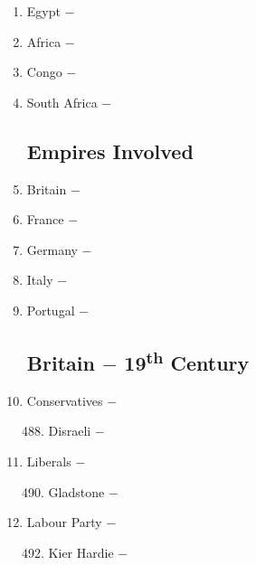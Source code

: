 \documentclass[12pt]{article}
\begin{document}
\begin{enumerate}
\item Egypt $-$

\item Africa $-$ 

\item Congo $-$ 

\item South Africa $-$ 

\subsection{Empires Involved}

\item Britain $-$ 

\item France $-$ 

\item Germany $-$ 

\item Italy $-$ 

\item Portugal $-$ 

\subsection{Britain $-$ 19\textsuperscript{th} Century}

\item Conservatives $-$ 

\begin{enumerate}[label=\arabic{*}.]
\setcounter{enumii}{487}

\item Disraeli $-$

\end{enumerate}
\setcounter{enumi}{488}

\item Liberals $-$ 

\begin{enumerate}[label=\arabic{*}.]
\setcounter{enumii}{489}

\item Gladstone $-$

\end{enumerate}
\setcounter{enumi}{490}

\item Labour Party $-$

\begin{enumerate}[label=\arabic{*}.]
\setcounter{enumii}{491}

\item Kier Hardie $-$ 


\end{enumerate}
\end{enumerate}
\end{document}
